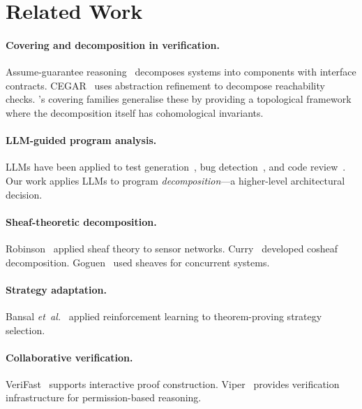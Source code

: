 \documentclass[11pt]{article}
\begin{document}
\section{Related Work}\label{sec:related}

\paragraph{Covering and decomposition in verification.}
Assume-guarantee reasoning~\cite{henzinger1998you} decomposes systems into
components with interface contracts.  CEGAR~\cite{clarke2000counterexample}
uses abstraction refinement to decompose reachability checks.  \JuGeo{}'s
covering families generalise these by providing a topological framework where
the decomposition itself has cohomological invariants.

\paragraph{LLM-guided program analysis.}
LLMs have been applied to test generation~\cite{lemieux2023codamosa}, bug
detection~\cite{pearce2022examining}, and code review~\cite{li2022automating}.
Our work applies LLMs to program \emph{decomposition}---a higher-level
architectural decision.

\paragraph{Sheaf-theoretic decomposition.}
Robinson~\cite{robinson2014topological} applied sheaf theory to sensor
networks.  Curry~\cite{curry2014sheaves} developed cosheaf decomposition.
Goguen~\cite{goguen1992sheaves} used sheaves for concurrent systems.

\paragraph{Strategy adaptation.}
Bansal \emph{et~al.}~\cite{bansal2019holist} applied reinforcement learning
to theorem-proving strategy selection.

\paragraph{Collaborative verification.}
VeriFast~\cite{jacobs2011verifast} supports interactive proof construction.
Viper~\cite{muller2016viper} provides verification infrastructure for
permission-based reasoning.
\end{document}
